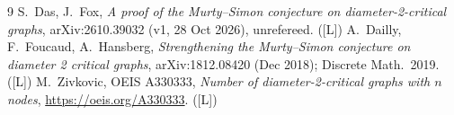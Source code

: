 \documentclass[10pt]{article}
\newcommand{\tier}[1]{\textsf{[#1]}}
\newcommand{\tL}{\tier{L}}
\begin{document}
\begin{thebibliography}{9}\small
{} S.\ Das, J.\ Fox, \emph{A proof of the Murty--Simon conjecture on diameter-2-critical graphs}, arXiv:2610.39032 (v1, 28 Oct 2026), unrefereed. (\tL)
 A.\ Dailly, F.\ Foucaud, A.\ Hansberg, \emph{Strengthening the Murty--Simon conjecture on diameter 2 critical graphs}, arXiv:1812.08420 (Dec 2018); Discrete Math.\ 2019. (\tL)
 M.\ Zivkovic, OEIS A330333, \emph{Number of diameter-2-critical graphs with $n$ nodes}, \url{https://oeis.org/A330333}. (\tL)
\end{thebibliography}
\end{document}
